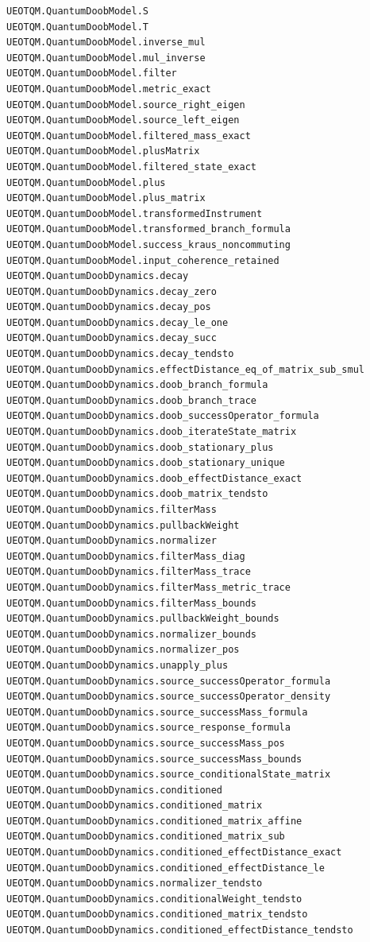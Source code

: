 \documentclass[
  11pt,
  oneside]{book}
\begin{document}
\begin{Verbatim}[breaklines,breakanywhere,fontsize=\scriptsize]
UEOTQM.QuantumDoobModel.S
UEOTQM.QuantumDoobModel.T
UEOTQM.QuantumDoobModel.inverse_mul
UEOTQM.QuantumDoobModel.mul_inverse
UEOTQM.QuantumDoobModel.filter
UEOTQM.QuantumDoobModel.metric_exact
UEOTQM.QuantumDoobModel.source_right_eigen
UEOTQM.QuantumDoobModel.source_left_eigen
UEOTQM.QuantumDoobModel.filtered_mass_exact
UEOTQM.QuantumDoobModel.plusMatrix
UEOTQM.QuantumDoobModel.filtered_state_exact
UEOTQM.QuantumDoobModel.plus
UEOTQM.QuantumDoobModel.plus_matrix
UEOTQM.QuantumDoobModel.transformedInstrument
UEOTQM.QuantumDoobModel.transformed_branch_formula
UEOTQM.QuantumDoobModel.success_kraus_noncommuting
UEOTQM.QuantumDoobModel.input_coherence_retained
UEOTQM.QuantumDoobDynamics.decay
UEOTQM.QuantumDoobDynamics.decay_zero
UEOTQM.QuantumDoobDynamics.decay_pos
UEOTQM.QuantumDoobDynamics.decay_le_one
UEOTQM.QuantumDoobDynamics.decay_succ
UEOTQM.QuantumDoobDynamics.decay_tendsto
UEOTQM.QuantumDoobDynamics.effectDistance_eq_of_matrix_sub_smul
UEOTQM.QuantumDoobDynamics.doob_branch_formula
UEOTQM.QuantumDoobDynamics.doob_branch_trace
UEOTQM.QuantumDoobDynamics.doob_successOperator_formula
UEOTQM.QuantumDoobDynamics.doob_iterateState_matrix
UEOTQM.QuantumDoobDynamics.doob_stationary_plus
UEOTQM.QuantumDoobDynamics.doob_stationary_unique
UEOTQM.QuantumDoobDynamics.doob_effectDistance_exact
UEOTQM.QuantumDoobDynamics.doob_matrix_tendsto
UEOTQM.QuantumDoobDynamics.filterMass
UEOTQM.QuantumDoobDynamics.pullbackWeight
UEOTQM.QuantumDoobDynamics.normalizer
UEOTQM.QuantumDoobDynamics.filterMass_diag
UEOTQM.QuantumDoobDynamics.filterMass_trace
UEOTQM.QuantumDoobDynamics.filterMass_metric_trace
UEOTQM.QuantumDoobDynamics.filterMass_bounds
UEOTQM.QuantumDoobDynamics.pullbackWeight_bounds
UEOTQM.QuantumDoobDynamics.normalizer_bounds
UEOTQM.QuantumDoobDynamics.normalizer_pos
UEOTQM.QuantumDoobDynamics.unapply_plus
UEOTQM.QuantumDoobDynamics.source_successOperator_formula
UEOTQM.QuantumDoobDynamics.source_successOperator_density
UEOTQM.QuantumDoobDynamics.source_successMass_formula
UEOTQM.QuantumDoobDynamics.source_response_formula
UEOTQM.QuantumDoobDynamics.source_successMass_pos
UEOTQM.QuantumDoobDynamics.source_successMass_bounds
UEOTQM.QuantumDoobDynamics.source_conditionalState_matrix
UEOTQM.QuantumDoobDynamics.conditioned
UEOTQM.QuantumDoobDynamics.conditioned_matrix
UEOTQM.QuantumDoobDynamics.conditioned_matrix_affine
UEOTQM.QuantumDoobDynamics.conditioned_matrix_sub
UEOTQM.QuantumDoobDynamics.conditioned_effectDistance_exact
UEOTQM.QuantumDoobDynamics.conditioned_effectDistance_le
UEOTQM.QuantumDoobDynamics.normalizer_tendsto
UEOTQM.QuantumDoobDynamics.conditionalWeight_tendsto
UEOTQM.QuantumDoobDynamics.conditioned_matrix_tendsto
UEOTQM.QuantumDoobDynamics.conditioned_effectDistance_tendsto
\end{Verbatim}
\end{document}
